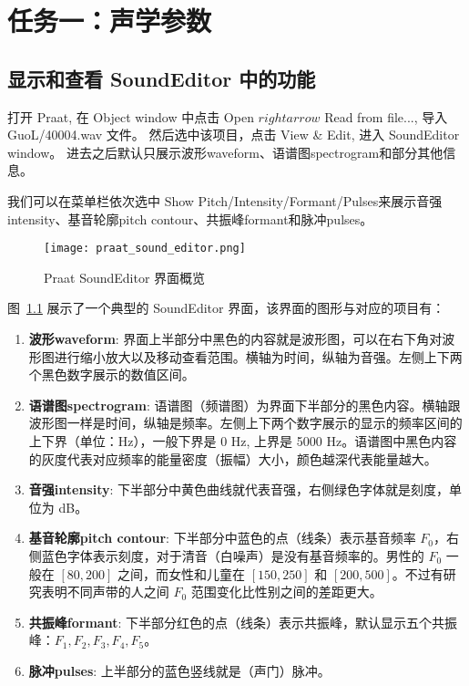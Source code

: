 \chapter{任务一：声学参数}
\label{chap:task1}

\section{显示和查看 SoundEditor 中的功能}

打开 Praat, 在 Object window 中点击 Open $rightarrow$ Read from file..., 导入 GuoL/40004.wav 文件。
然后选中该项目，点击 View \& Edit, 进入 SoundEditor window。
进去之后默认只展示波形waveform、语谱图spectrogram和部分其他信息。

我们可以在菜单栏依次选中 Show Pitch/Intensity/Formant/Pulses来展示音强intensity、基音轮廓pitch contour、共振峰formant和脉冲pulses。

\begin{figure}[H]
  \centering
  \texttt{[image: praat\_sound\_editor.png]}
  \caption{Praat SoundEditor 界面概览}
  \label{fig:praat_sound_editor}
\end{figure}

图~\ref{fig:praat_sound_editor} 展示了一个典型的 SoundEditor 界面，该界面的图形与对应的项目有：

\begin{enumerate}
  \item \textbf{波形waveform}: 界面上半部分中黑色的内容就是波形图，可以在右下角对波形图进行缩小放大以及移动查看范围。横轴为时间，纵轴为音强。左侧上下两个黑色数字展示的数值区间。
  \item \textbf{语谱图spectrogram}: 语谱图（频谱图）为界面下半部分的黑色内容。横轴跟波形图一样是时间，纵轴是频率。左侧上下两个数字展示的显示的频率区间的上下界（单位：Hz），一般下界是 0 Hz, 上界是 5000 Hz。语谱图中黑色内容的灰度代表对应频率的能量密度（振幅）大小，颜色越深代表能量越大。
  \item \textbf{音强intensity}: 下半部分中黄色曲线就代表音强，右侧绿色字体就是刻度，单位为 dB。
  \item \textbf{基音轮廓pitch contour}: 下半部分中蓝色的点（线条）表示基音频率 $F_0$，右侧蓝色字体表示刻度，对于清音（白噪声）是没有基音频率的。男性的 $F_0$ 一般在 $[80, 200]$ 之间，而女性和儿童在 $[150, 250]$ 和 $[200, 500]$。不过有研究表明不同声带的人之间 $F_0$ 范围变化比性别之间的差距更大。
  \item \textbf{共振峰formant}: 下半部分红色的点（线条）表示共振峰，默认显示五个共振峰：$F_1, F_2, F_3, F_4, F_5$。
  \item \textbf{脉冲pulses}: 上半部分的蓝色竖线就是（声门）脉冲。
\end{enumerate}

